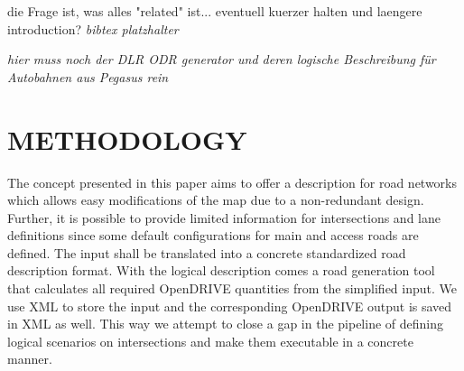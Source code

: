 \documentclass[a4paper, 10pt, conference]{ieeeconf}      %
\begin{document}
die Frage ist, was alles "related" ist... eventuell kuerzer halten und laengere introduction? \textit{bibtex platzhalter} \cite{BagschikG..2018} \cite{Roesener2017}

\textit{hier muss noch der DLR ODR generator und deren logische Beschreibung für Autobahnen aus Pegasus rein \cite{dlrODRgen}}

\section{METHODOLOGY}
The concept presented in this paper aims to offer a description for road networks which allows easy modifications of the map due to a non-redundant design. Further, it is possible to provide limited information for intersections and lane definitions since some default configurations for main and access roads are defined. The input shall be translated into a concrete standardized road description format. With the logical description comes a road generation tool that calculates all required OpenDRIVE quantities from the simplified input. We use XML to store the input and the corresponding OpenDRIVE output is saved in XML as well. This way we attempt to close a gap in the pipeline of defining logical scenarios on intersections and make them executable in a concrete manner.
\end{document}
